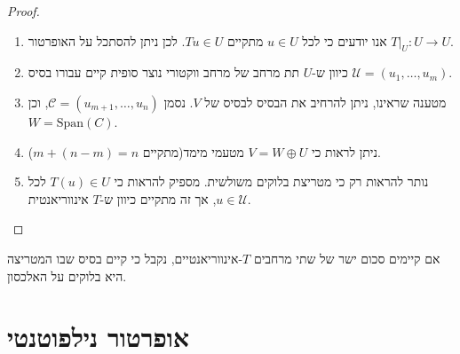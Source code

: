 \documentclass{tstextbook}
\begin{document}
\begin{proof}
  \begin{enumerate}
    \item אנו יודעים כי לכל \(u \in U\) מתקיים \(Tu \in U\). לכן ניתן להסתכל על האופרטור \(T|_{U}:U\to U\). 


    \item כיוון ש-\(U\) תת מרחב של מרחב ווקטורי נוצר סופית קיים עבורו בסיס \(\mathcal{U}=\left( u_{1},\dots, u_{m} \right)\).  


    \item מטענה שראינו, ניתן להרחיב את הבסיס לבסיס של \(V\). נסמן \(\mathcal{C}=\left( u_{m+1},\dots,u_{n} \right)\), וכן \(W=\mathrm{Span}(C)\). 


    \item ניתן לראות כי \(V=W\oplus U\) מטעמי מימד(מתקיים \(m+(n-m)=n\)). 


    \item נותר להראות רק כי מטריצת בלוקים משולשית.  מספיק להראות כי \(T(u)\in U\) לכל \(u \in \mathcal{ U}\), אך זה מתקיים כיוון ש-\(T\) אינווריאנטית. 


  \end{enumerate}
\end{proof}
\begin{corollary}
אם קיימים סכום ישר של שתי מרחבים \(T\)-אינווריאנטיים, נקבל כי קיים בסיס שבו המטריצה היא בלוקים על האלכסון.

\end{corollary}
\section{אופרטור נילפוטנטי}
\end{document}
